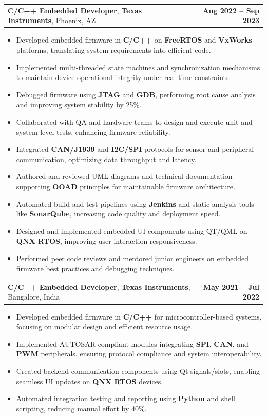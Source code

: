 \documentclass[letterpaper,11pt]{article}
\makeatletter
\newcommand{\resumeItem}[1]{
  \item\footnotesize{
    {#1 \vspace{-2pt}}
  }
}
\newcommand{\resumeSubheading}[4]{
  \vspace{-2pt}\item
    \begin{tabular*}{1.0\textwidth}[t]{l@{\extracolsep{\fill}}r}
      \textbf{\fontsize{10pt}{14pt}\selectfont #3}, \textbf{\fontsize{10pt}{14pt}\selectfont #1}, \fontsize{10pt}{14pt}\selectfont #4 & \textbf{\fontsize{10pt}{14pt}\selectfont #2} \\
    \end{tabular*}\vspace{-7pt}
}
\newcommand{\resumeItemListStart}{\begin{itemize}[leftmargin=*]}
\newcommand{\resumeItemListEnd}{\end{itemize}\vspace{-5pt}}
\makeatother
\begin{document}
    \resumeSubheading
        {Texas Instruments}{Aug 2022 -- Sep 2023}
        {C/C++ Embedded Developer}{Phoenix, AZ}
      \resumeItemListStart
        \resumeItem{Developed embedded firmware in \textbf{C/C++} on \textbf{FreeRTOS} and \textbf{VxWorks} platforms, translating system requirements into efficient code.}
        \resumeItem{Implemented multi-threaded state machines and synchronization mechanisms to maintain device operational integrity under real-time constraints.}
        \resumeItem{Debugged firmware using \textbf{JTAG} and \textbf{GDB}, performing root cause analysis and improving system stability by 25\%.}
        \resumeItem{Collaborated with QA and hardware teams to design and execute unit and system-level tests, enhancing firmware reliability.}
        \resumeItem{Integrated \textbf{CAN/J1939} and \textbf{I2C/SPI} protocols for sensor and peripheral communication, optimizing data throughput and latency.}
        \resumeItem{Authored and reviewed UML diagrams and technical documentation supporting \textbf{OOAD} principles for maintainable firmware architecture.}
        \resumeItem{Automated build and test pipelines using \textbf{Jenkins} and static analysis tools like \textbf{SonarQube}, increasing code quality and deployment speed.}
        \resumeItem{Designed and implemented embedded UI components using QT/QML on \textbf{QNX RTOS}, improving user interaction responsiveness.}
        \resumeItem{Performed peer code reviews and mentored junior engineers on embedded firmware best practices and debugging techniques.}
      \resumeItemListEnd

    \resumeSubheading
        {Texas Instruments}{May 2021 -- Jul 2022}
        {C/C++ Embedded Developer}{Bangalore, India}
      \resumeItemListStart
        \resumeItem{Developed embedded firmware in \textbf{C/C++} for microcontroller-based systems, focusing on modular design and efficient resource usage.}
        \resumeItem{Implemented AUTOSAR-compliant modules integrating \textbf{SPI}, \textbf{CAN}, and \textbf{PWM} peripherals, ensuring protocol compliance and system interoperability.}
        \resumeItem{Created backend communication components using Qt signals/slots, enabling seamless UI updates on \textbf{QNX RTOS} devices.}
        \resumeItem{Automated integration testing and reporting using \textbf{Python} and shell scripting, reducing manual effort by 40\%.}
      \resumeItemListEnd
\end{document}
